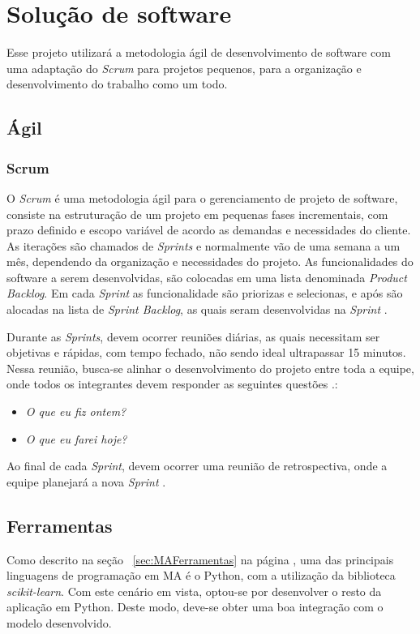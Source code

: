 \chapter[Solução de software]{Solução de software}
Esse projeto utilizará a metodologia ágil de desenvolvimento de software com uma adaptação do \textit{Scrum} para projetos pequenos, para a organização e desenvolvimento do trabalho como um todo.

\section{Ágil}
\subsection{Scrum}
O \textit{Scrum} é uma metodologia ágil para o gerenciamento de projeto de software, consiste na estruturação de um projeto em pequenas fases incrementais, com prazo definido e escopo variável de acordo as demandas e necessidades do cliente. As iterações são chamados de \textit{Sprints} e normalmente vão de uma semana a um mês, dependendo da organização e necessidades do projeto. As funcionalidades do software a serem desenvolvidas, são colocadas em uma lista denominada \textit{Product Backlog}. Em cada \textit{Sprint} as funcionalidade são priorizas e selecionas, e após são alocadas na lista de \textit{Sprint Backlog}, as quais seram desenvolvidas na \textit{Sprint} \cite{sutherland2016scrum}.

Durante as \textit{Sprints}, devem ocorrer reuniões diárias, as quais necessitam ser objetivas e rápidas, com tempo fechado, não sendo ideal ultrapassar 15 minutos. Nessa reunião, busca-se alinhar o desenvolvimento do projeto entre toda a equipe, onde todos os integrantes devem responder as seguintes questões \cite{sutherland2016scrum}.:
\begin{itemize}
    \item \textit{O que eu fiz ontem?}
    \item \textit{O que eu farei hoje?}
\end{itemize}

Ao final de cada \textit{Sprint}, devem ocorrer uma reunião de retrospectiva, onde a equipe planejará a nova \textit{Sprint} \cite{sutherland2016scrum}.

\section{Ferramentas}
Como descrito na seção ~\ref{sec:MAFerramentas} na página \pageref{sec:MAFerramentas}, uma das principais linguagens de programação em MA é o Python, com a utilização da biblioteca \textit{scikit-learn}. Com este cenário em vista, optou-se por desenvolver o resto da aplicação em Python. Deste modo, deve-se obter uma boa integração com o modelo desenvolvido.

